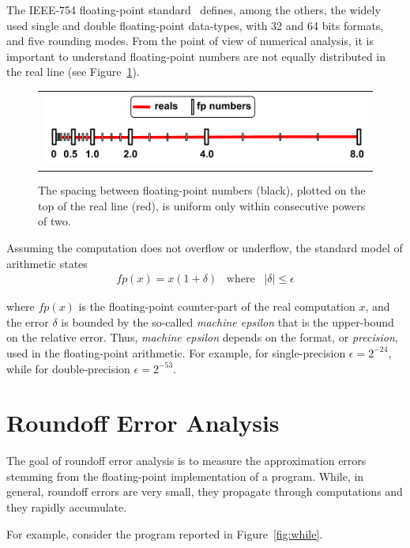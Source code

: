 The IEEE-754 floating-point standard~\cite{} defines, among the others, the widely used single and double floating-point data-types, with 32 and 64 bits formats, and five rounding modes.
%
From the point of view of numerical analysis, it is important to understand floating-point numbers are not equally distributed in the real line (see Figure~\ref{fig:line}).
%
\begin{figure}[h!]
	\centering
	\begin{tabular}{l}
		\includegraphics[width=1.0\textwidth]{pic/fpnumbers.png}
	\end{tabular}
	\caption{The spacing between floating-point numbers (black), plotted on the top of the real line (red), is uniform only within consecutive powers of two.}
	\label{fig:line}
\end{figure}
Assuming the computation does not overflow or underflow, the standard model of arithmetic states
%
\begin{align}
fp(x)=x(1+\delta)\;\;\;\text{where}\;\;\;|\delta|\leq\epsilon
\label{standard}
\end{align}
%

where $fp(x)$ is the floating-point counter-part of the real computation $x$, and the error $\delta$ is bounded by the so-called \emph{machine epsilon} that is the upper-bound on the relative error. Thus, \emph{machine epsilon} depends on the format, or \emph{precision}, used in the floating-point arithmetic. For example, for single-precision $\epsilon=2^{-24}$, while for double-precision $\epsilon=2^{-53}$.
%
\section{Roundoff Error Analysis}
%
The goal of roundoff error analysis is to measure the approximation errors stemming from the floating-point implementation of a program.
%
While, in general, roundoff errors are very small, they propagate through computations and they rapidly accumulate.
%

For example, consider the program reported in Figure~\ref{fig:while}.

